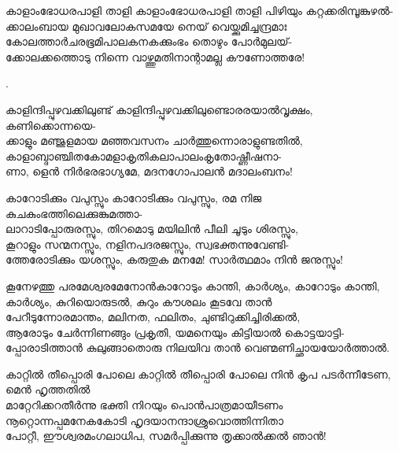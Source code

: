 \begin{enumerate}


\begin{slokam}{\VSv}{\Unk}{കാളാംഭോധരപാളി താളി}
കാളാംഭോധരപാളി താളി പിഴിയും കറ്റക്കരിമ്പൂങ്കുഴൽ-\\
ക്കാലംബായ മുഖാവലോകസമയേ നെയ്‌ വെയ്ക്കുമിച്ചന്ദ്രമാഃ\\
കോലത്താർചരഭൂമിപാലകനകക്കുംഭം തൊഴും പോർമുലയ്‌-\\
ക്കോലക്കത്തൊടു നിന്നെ വാഴ്ത്തുമതിനാന്റാമല്ല കൗണോത്തരേ!
\end{slokam}


.


\begin{slokam}{\VSv}{\VKG}{കാളിന്ദിപ്പുഴവക്കിലുണ്ട്}
കാളിന്ദിപ്പുഴവക്കിലുണ്ടൊരരയാൽവൃക്ഷം, കണിക്കൊന്നയെ-\\
ക്കാളും മഞ്ജുളമായ മഞ്ഞവസനം ചാർത്തുന്നൊരാളുണ്ടതിൽ,\\
കാളാബ്ദാഞ്ചിതകോമളാകൃതികലാപാലംകൃതോഷ്ണീഷനാ-\\
ണാ, ളെൻ നിർഭരഭാഗ്യമേ, മദനഗോപാലൻ മദാലംബനം!
\end{slokam}



\begin{slokam}{\VSr}{\VKG}{കാറോടിക്കും വപുസ്സും}
കാറോടിക്കും വപുസ്സും, രമ നിജ കുചകുംഭത്തിലെക്കുങ്കുമത്താ-\\
ലാറാടിപ്പോരുരസ്സും, തിറമൊടു മയിലിൻ പീലി ചൂടും ശിരസ്സും,\\
കൂറാളും സന്മനസ്സും, നളിനപദരജസ്സും, സ്വഭക്തന്നുവേണ്ടി-\\
ത്തേരോടിക്കും യശസ്സും, കരുതുക മനമേ! സാർത്ഥമാം നിൻ ജനുസ്സും!
\end{slokam}


\begin{slokam}{\VSr}{കൂനേഴത്തു പരമേശ്വരമേനോൻ}{കാറോടും കാന്തി, കാർശ്യം,}
കാറോടും കാന്തി, കാർശ്യം, കുറിയൊരുടൽ, കുറും കൗശലം കൂടവേ താൻ\\
പേറീടുന്നോരമാന്തം, മലിനത, ഫലിതം, ചുണ്ടിറുക്കിച്ചിരിക്കൽ, \\
ആരോടും ചേർന്നിണങ്ങും പ്രകൃതി, യമനെയും കിട്ടിയാൽ കൊട്ടയാട്ടി-\\
പ്പോരാടിത്താൻ കുലുങ്ങാതൊരു നിലയിവ താൻ വെണ്മണിച്ഛായയോർത്താൽ. 
\end{slokam}



\begin{slokam}{\VSv}{\UN}{കാറ്റിൽ തീപ്പൊരി പോലെ}
കാറ്റിൽ തീപ്പൊരി പോലെ നിൻ കൃപ പടർന്നീടേണ, മെൻ ഹൃത്തതിൽ\\
മാറ്റേറിക്കറതീർന്നു ഭക്തി നിറയും പൊൻപാത്രമായീടണം\\
നൂറ്റൊന്നപ്പമനേകകോടി ഹൃദയാനന്ദാശ്രുവൊത്തിന്നിതാ\\
പോറ്റീ, ഈശ്വരമംഗലാധിപ, സമർപ്പിക്കുന്നു തൃക്കാൽക്കൽ ഞാൻ!
\end{slokam}


\end{enumerate}
